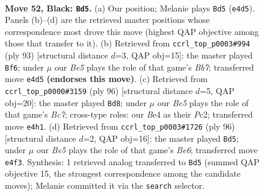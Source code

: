 \documentclass[11pt]{article}
\begin{document}
\clearpage

\begin{figure}[p]\centering
\begin{subfigure}{0.46\textwidth}\centering
\resizebox{\linewidth}{!}{%
\newchessgame
\chessboard[
  setfen={4R3/6k1/8/1pp5/4b3/8/8/5K2 b - - 9 52},
  showmover=false,
  pgfstyle=straightmove, color=movearrow, markmove={e4-d5}
]}
\caption{}
\end{subfigure}\hfill
\begin{subfigure}{0.46\textwidth}\centering
\resizebox{\linewidth}{!}{%
\newchessgame
\chessboard[
  setfen={8/1R6/4p3/p7/6k1/3K4/1b3P2/8 b - - 3 47},
  showmover=false,
  pgfstyle=straightmove, color=movearrow, markmove={b2-f6}
]}
\caption{}
\end{subfigure}
\\[4pt]
\begin{subfigure}{0.46\textwidth}\centering
\resizebox{\linewidth}{!}{%
\newchessgame
\chessboard[
  setfen={8/2B5/8/3P1k2/2r5/K7/2P5/8 w - - 14 49},
  showmover=false,
  pgfstyle=straightmove, color=movearrow, markmove={c7-d8}
]}
\caption{}
\end{subfigure}\hfill
\begin{subfigure}{0.46\textwidth}\centering
\resizebox{\linewidth}{!}{%
\newchessgame
\chessboard[
  setfen={1k6/8/4B3/P7/1P6/8/1K6/4r3 w - - 3 49},
  showmover=false,
  pgfstyle=straightmove, color=movearrow, markmove={e6-d5}
]}
\caption{}
\end{subfigure}
\caption{\textbf{Move 52, Black: \texttt{Bd5}.} (a) Our position; Melanie plays \texttt{Bd5} (\texttt{e4d5}). Panels (b)--(d) are the retrieved master positions whose correspondence most drove this move (highest QAP objective among those that transfer to it). (b) Retrieved from \texttt{ccrl\_top\_p0003\#994} (ply 93) [structural distance $d$=3, QAP obj=15]: the master played \texttt{Bf6}; under $\mu$ our \emph{Be5} plays the role of that game's \emph{Bb7}; transferred move \texttt{e4d5} \textbf{(endorses this move)}. (c) Retrieved from \texttt{ccrl\_top\_p0000\#3159} (ply 96) [structural distance $d$=5, QAP obj=20]: the master played \texttt{Bd8}; under $\mu$ our \emph{Be5} plays the role of that game's \emph{Bc7}; cross-type roles: our \emph{B}e4 as their \emph{P}c2; transferred move \texttt{e4h1}. (d) Retrieved from \texttt{ccrl\_top\_p0003\#1726} (ply 96) [structural distance $d$=2, QAP obj=16]: the master played \texttt{Bd5}; under $\mu$ our \emph{Be5} plays the role of that game's \emph{Be6}; transferred move \texttt{e4f3}. Synthesis: 1 retrieved analog transferred to \texttt{Bd5} (summed QAP objective 15, the strongest correspondence among the candidate moves); Melanie committed it via the \texttt{search} selector.}
\label{fig:thought-m103}
\end{figure}
\end{document}
